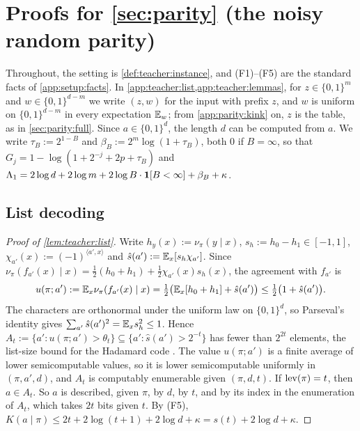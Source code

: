 \section{Proofs for \texorpdfstring{\cref{sec:parity}}{Section \ref*{sec:parity}} (the noisy random parity)}\label{app:parity}\label{app:algstat}

Throughout, the setting is \cref{def:teacher:instance}, and (F1)--(F5) are the standard facts of \cref{app:setup:facts}. In \cref{app:teacher:list,app:teacher:lemmas}, for $z\in\{0,1\}^m$ and $w\in\{0,1\}^{d-m}$ we write $(z,w)$ for the input with prefix $z$, and $w$ is uniform on $\{0,1\}^{d-m}$ in every expectation $\mathbb{E}_w$; from \cref{app:parity:kink} on, $z$ is the table, as in \cref{sec:parity:full}. Since $a\in\{0,1\}^d$, the length $d$ can be computed from $a$. We write $\tau_B:=2^{1-B}$ and $\beta_B:=2^m\log(1+\tau_B)$, both $0$ if $B=\infty$, so that $G_j=1-\log(1+2^{-j}+2p+\tau_B)$ and $\Lambda_1=2\log d+2\log m+2\log B\cdot\mathbf{1}[B<\infty]+\beta_B+\kappa$.

\subsection{List decoding}\label{app:teacher:list}

\begin{proof}[Proof of \cref{lem:teacher:list}]
Write $h_y(x):=\nu_\pi(y\mid x)$, $s_h:=h_0-h_1\in[-1,1]$, $\chi_{a'}(x):=(-1)^{\langle a',x\rangle}$ and $\hat s(a'):=\mathbb{E}_x[s_h\chi_{a'}]$. Since $\nu_\pi(f_{a'}(x)\mid x)=\frac12(h_0+h_1)+\frac12\chi_{a'}(x)s_h(x)$, the agreement with $f_{a'}$ is
\[
u(\pi;a'):=\mathbb{E}_x\nu_\pi(f_{a'}(x)\mid x)=\tfrac12\big(\mathbb{E}_x[h_0+h_1]+\hat s(a')\big)\le\tfrac12\big(1+\hat s(a')\big).
\]
The characters are orthonormal under the uniform law on $\{0,1\}^d$, so Parseval's identity gives $\sum_{a'}\hat s(a')^2=\mathbb{E}_xs_h^2\le1$. Hence $A_t:=\{a':u(\pi;a')>\theta_t\}\subseteq\{a':\hat s(a')>2^{-t}\}$ has fewer than $2^{2t}$ elements, the list-size bound for the Hadamard code \citep{goldreich1989hard,kushilevitz1993learning}. The value $u(\pi;a')$ is a finite average of lower semicomputable values, so it is lower semicomputable uniformly in $(\pi,a',d)$, and $A_t$ is computably enumerable given $(\pi,d,t)$. If $\operatorname{lev}(\pi)=t$, then $a\in A_t$. So $a$ is described, given $\pi$, by $d$, by $t$, and by its index in the enumeration of $A_t$, which takes $2t$ bits given $t$. By (F5), $K(a\mid\pi)\le2t+2\log(t+1)+2\log d+\kappa=s(t)+2\log d+\kappa$.
\end{proof}

